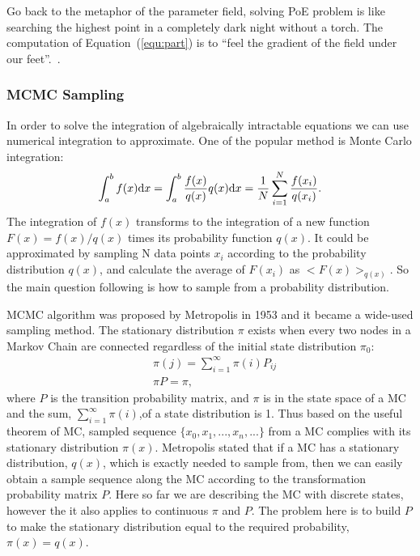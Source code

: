 Go back to the metaphor of the parameter field, solving PoE problem is like searching the highest point in a completely dark night without a torch.
The computation of Equation~(\ref{equ:part}) is to ``feel the gradient of the field under our feet''.~\cite{woodfordnotes}.
\subsubsection{MCMC Sampling}
\label{sec:mcmc}
In order to solve the integration of algebraically intractable equations we can use numerical integration to approximate.
One of the popular method is Monte Carlo integration:
\begin{equation}
\int_{a}^{b} f(x) \mathrm{d} x = \int_{a}^{b}\frac{f(x)}{q(x)}q(x)\mathrm{d} x = \dfrac{1}{N}\sum_{i=1}^{N}\frac{f(x_i)}{q(x_i)}.
\end{equation}
The integration of $ f(x) $ transforms to the integration of a new function $ F(x) = f(x)/q(x)  $ times its probability function $ q(x) $.
It could be approximated by sampling N data points $ x_i $ according to the probability distribution $ q(x) $, and calculate the average of $ F(x_i) $ as $ <F(x)>_{q(x)}$.
So the main question following is how to sample from a probability distribution.

MCMC algorithm was proposed by Metropolis in 1953 and it became a wide-used sampling method.
The stationary distribution $ \pi $ exists when every two nodes in a Markov Chain are connected regardless of the initial state distribution $ \pi_0 $:
\begin{equation}
\begin{aligned}
&\pi(j) = \sum_{i=1}^{\infty}\pi(i)P_{ij} \\
&\pi P = \pi,
\end{aligned}
\end{equation}
where $ P $ is the transition probability matrix, and $ \pi $ is in the state space of a MC and the sum, $ \sum_{i=1}^{\infty}\pi(i) $,of a state distribution is 1.
Thus based on the useful theorem of MC, sampled sequence $ \{x_0, x_1, ..., x_n, ... \}$ from a MC complies with its stationary distribution $ \pi(x) $.
Metropolis stated that if a MC has a stationary distribution, $ q(x) $, which is exactly needed to sample from, then we can easily obtain a sample sequence along the MC according to the transformation probability matrix $ P $.
Here so far we are describing the MC with discrete states, however the it also applies to continuous $ \pi $ and $ P $.
The problem here is to build $ P $ to make the stationary distribution equal to the required probability, $ \pi(x) = q(x) $.

